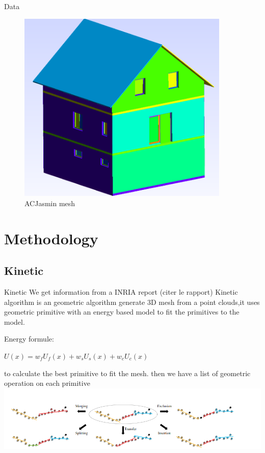 \documentclass[10pt]{beamer}
\begin{document}
\begin{frame}{Data}
\begin{figure}
\begin{minipage}{0.33\textwidth}
        \end{minipage}%
        \begin{minipage}{0.33\textwidth}
            \centering
            \includegraphics[width=0.9\textwidth]{../image/ACJasmin.png}
        \end{minipage}%
        \caption{ACJasmin mesh}
    \end{figure}
\end{frame}


\section{Methodology}
\subsection{Kinetic}
\begin{frame}{Kinetic}
We get information from a INRIA report (citer le rapport)
Kinetic algorithm is an geometric algorithm generate 3D mesh from a point clouds,it uses  geometric primitive with an energy based model to fit the primitives to the model.

Energy formule: 
\newline
\begin{center}
    $        U(x) = w_f U_f(x) + w_s U_s(x) + w_c U_c(x)       $
\end{center}

to calculate the best primitive to fit the mesh.
then we have a list of geometric operation on each primitive
\includegraphics[scale=0.35]{../image/primitives_operation.png}
\end{frame}
\end{document}

